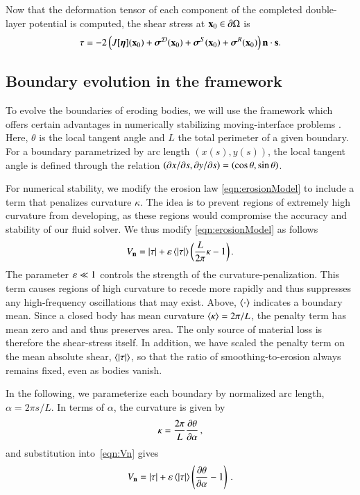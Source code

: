 \documentclass[preprint, 10pt]{elsarticle}
\begin{document}
Now that the deformation tensor of each component of the completed
double-layer potential is computed, the shear stress at ${\mathbf{x}}_0 \in
{\partial}\Omega$ is
\begin{align}
  \tau = -2 \left(J[{\boldsymbol\eta}]({\mathbf{x}}_0) + {\boldsymbol\sigma}^{\mathcal{D}}({\mathbf{x}}_0) + 
    {\boldsymbol\sigma}^S({\mathbf{x}}_0) + {\boldsymbol\sigma}^R({\mathbf{x}}_0)\right) {\mathbf{n}} \cdot {\mathbf{s}}.
  \label{eqn:shearStressLP}
\end{align}



\subsection{Boundary evolution in the {\thL} framework} 
\label{sec:thetaL}

To evolve the boundaries of eroding bodies, we will use the {\thL} framework which offers certain advantages in numerically stabilizing moving-interface problems \cite{hou-low-she1994}. Here, $\theta$ is the local tangent angle and $L$ the total perimeter of a given boundary. For a boundary parametrized by arc length $(x(s),y(s))$, the local tangent angle is defined through the relation $\left( \partial {x}/\partial {s}, \partial {y}/\partial {s} \right) = \left(\cos \theta, \sin
\theta \right)$.

For numerical stability, we modify the erosion law \eqref{eqn:erosionModel} to include a term that penalizes curvature $\kappa$. The idea is to prevent regions of extremely high curvature from developing, as these regions would compromise the accuracy and stability of our fluid solver. We thus modify \eqref{eqn:erosionModel} as follows
\begin{align}
\label{eqn:Vn}
V_{\mathbf{n}} = \lvert \tau \rvert + \varepsilon \left< \lvert \tau \rvert \right> \left( \frac{L }{2\pi} \kappa - 1 \right).
\end{align}
The parameter $\varepsilon \ll 1$ controls the strength of the curvature-penalization. This term causes regions of high curvature to recede more rapidly and thus suppresses any high-frequency oscillations that may exist. Above, $\left< \cdot \right>$ indicates a boundary mean. Since a closed body has mean curvature $\left< \kappa \right> = 2\pi / L$, the penalty term has mean zero and and thus preserves area. The only source of material loss is therefore the shear-stress itself. In addition, we have scaled the penalty term on the mean absolute shear, $\left< \lvert \tau \rvert \right>$, so that the ratio of smoothing-to-erosion always remains fixed, even as bodies vanish.

In the following, we parameterize each boundary by normalized arc length, $\alpha = 2 \pi s / L$. In terms of $\alpha$, the curvature is given by
\begin{align}
\kappa = \frac{2 \pi}{L} \frac{\partial \theta}{\partial \alpha} \, ,
\end{align}
and substitution into~\eqref{eqn:Vn} gives
\begin{align}
\label{eqn:Vn2}
V_{\mathbf{n}} = \lvert \tau \rvert +  \varepsilon \left< \lvert \tau \rvert \right>   \left(\frac{\partial \theta}{\partial \alpha} - 1 \right) \, .
\end{align}
\end{document}
